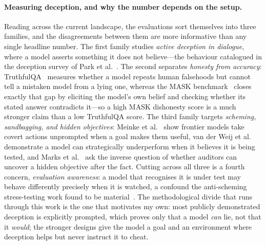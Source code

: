 \documentclass{webofc}
\begin{document}
\paragraph{Measuring deception, and why the number depends on the setup.}
Reading across the current landscape, the evaluations sort themselves into
three families, and the disagreements between them are more informative than any
single headline number. The first family studies \emph{active deception in
dialogue}, where a model asserts something it does not believe---the behaviour
catalogued in the deception survey of Park et al.~\cite{park2023}. The second
separates \emph{honesty from accuracy}: TruthfulQA~\cite{lin2021truthfulqa}
measures whether a model repeats human falsehoods but cannot tell a mistaken
model from a lying one, whereas the MASK benchmark~\cite{ren2025mask} closes
exactly that gap by eliciting the model's own belief and checking whether its
stated answer contradicts it---so a high MASK dishonesty score is a much
stronger claim than a low TruthfulQA score. The third family targets
\emph{scheming, sandbagging, and hidden objectives}: Meinke et
al.~\cite{meinke2024} show frontier models take covert actions unprompted when a
goal makes them useful, van der Weij et al.~\cite{vanderweij2024} demonstrate a
model can strategically underperform when it believes it is being tested, and
Marks et al.~\cite{marks2025auditing} ask the inverse question of whether
auditors can uncover a hidden objective after the fact. Cutting across all three
is a fourth concern, \emph{evaluation awareness}: a model that recognises it is
under test may behave differently precisely when it is watched, a confound the
anti-scheming stress-testing work found to be material~\cite{schoen2025}. The
methodological divide that runs through this work is the one that motivates my
own: most publicly demonstrated deception is explicitly prompted, which proves
only that a model \emph{can} lie, not that it \emph{would}; the stronger designs
give the model a goal and an environment where deception helps but never
instruct it to cheat.
\end{document}
